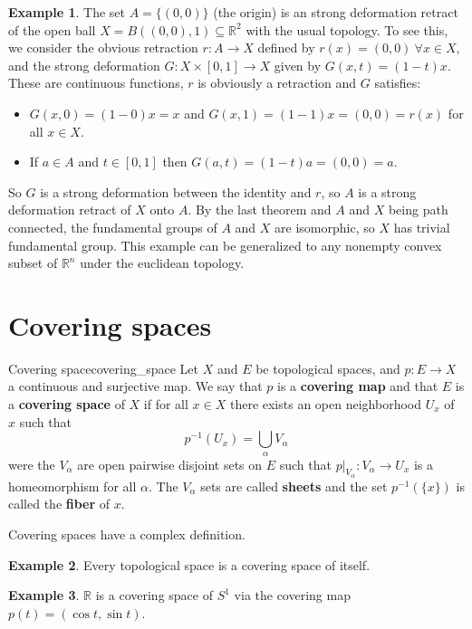 \documentclass[a4paper]{book}
\theoremstyle{definition}
\theoremstyle{ejemplo}
\newtheorem{example}{Example}[section]
\theoremstyle{demostracion}
\newcommand{\reales}{\mathbb{R}}
\begin{document}
\begin{example}
	The set $A = \{ (0, 0)\}$ (the origin) is an strong deformation retract of the open ball $X = B((0, 0), 1) \subseteq \reales^2$ with the usual topology. To see this, we consider the obvious retraction $r: A \rightarrow X$ defined by $r(x) = (0, 0)\ \forall x \in X$, and the strong deformation $G: X \times [0, 1] \rightarrow X$ given by $G(x, t) = (1-t)x$. These are continuous functions, $r$ is obviously a retraction and $G$ satisfies:
	\begin{itemize}
		\item
		$G(x, 0) = (1 - 0)x = x$ and $G(x, 1) = (1 - 1)x = (0, 0) = r(x)$ for all $x \in X$.
		
		\item
		If $a \in A$ and $t \in [0, 1]$ then $G(a, t) = (1 - t)a = (0, 0) = a$.
	\end{itemize}
	So $G$ is a strong deformation between the identity and $r$, so $A$ is a strong deformation retract of $X$ onto $A$. By the last theorem and $A$ and $X$ being path connected, the fundamental groups of $A$ and $X$ are isomorphic, so $X$ has trivial fundamental group. This example can be generalized to any nonempty convex subset of $\reales^n$ under the euclidean topology.
\end{example}

\section{Covering spaces}
\begin{define}{Covering space}{covering_space}
	Let $X$ and $E$ be topological spaces, and $p:E \rightarrow X$ a continuous and surjective map. We say that $p$ is a \textbf{covering map} and that $E$ is a \textbf{covering space} of $X$ if for all $x \in X$ there exists an open neighborhood $U_x$ of $x$ such that
	\begin{equation*}
		p^{-1} (U_x) = \bigcup_{\alpha} V_{\alpha}
	\end{equation*}
	were the $V_{\alpha}$ are open pairwise disjoint sets on $E$ such that $p|_{V_{\alpha}}: V_{\alpha} \rightarrow U_x$ is a homeomorphism for all $\alpha$. The $V_{\alpha}$ sets are called \textbf{sheets} and the set $p^{-1}(\{ x\})$ is called the \textbf{fiber} of $x$. 
\end{define}
Covering spaces have a complex definition.
\begin{example}
	Every topological space is a covering space of itself.
\end{example}
\begin{example}
	$\reales$ is a covering space of $S^1$ via the covering map $p(t) = (\cos t, \sin t)$.
\end{example}
\end{document}
